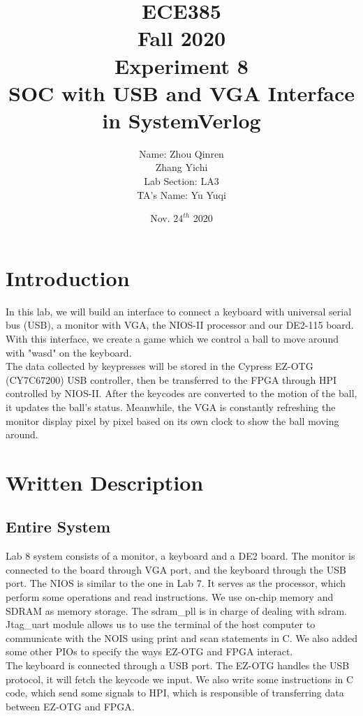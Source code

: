 \documentclass[12pt]{article}
\title{
    \textbf{\Huge ECE385} \\
    \huge Fall 2020 \\
    \huge Experiment 8 \\[120pt]
    \textbf{\Huge SOC with USB and VGA Interface in SystemVerlog} \\[120pt]
    }
\author{
    \large Name: Zhou Qinren \\ 
            \quad\qquad Zhang Yichi \\
    \large Lab Section: LA3 \\
    \large TA's Name: Yu Yuqi
    }
\date{Nov. $24^{th}$ 2020}
\begin{document}
\setlength{\parindent}{0pt}
\maketitle
\newpage

\section{Introduction}
In this lab, we will build an interface to connect a keyboard with universal serial bus (USB), a monitor with VGA, the NIOS-II processor and our DE2-115 board. With this interface, we create a game which we control a ball to move around with "wasd" on the keyboard. \\

The data collected by keypresses will be stored in the Cypress EZ-OTG (CY7C67200) USB controller, then be transferred to the FPGA through HPI controlled by NIOS-II. After the keycodes are converted to the motion of the ball, it updates the ball's status. Meanwhile, the VGA is constantly refreshing the monitor display pixel by pixel based on its own clock to show the ball moving around.

\section{Written Description}
\subsection{Entire System}
Lab 8 system consists of a monitor, a keyboard and a DE2 board. The monitor is connected to the board through VGA port, and the keyboard through the USB port. The NIOS is similar to the one in Lab 7. It serves as the processor, which perform some operations and read instructions. We use on-chip memory and SDRAM as memory storage. The sdram\_pll is in charge of dealing with sdram. Jtag\_uart module allows us to use the terminal of the host computer to communicate with the NOIS using print and scan statements in C. We also added some other PIOs to specify the ways EZ-OTG and FPGA interact. \\

The keyboard is connected through a USB port. The EZ-OTG handles the USB protocol, it will fetch the keycode we input. We also write some instructions in C code, which send some signals to HPI, which is responsible of transferring data between EZ-OTG and FPGA. \\
\end{document}
